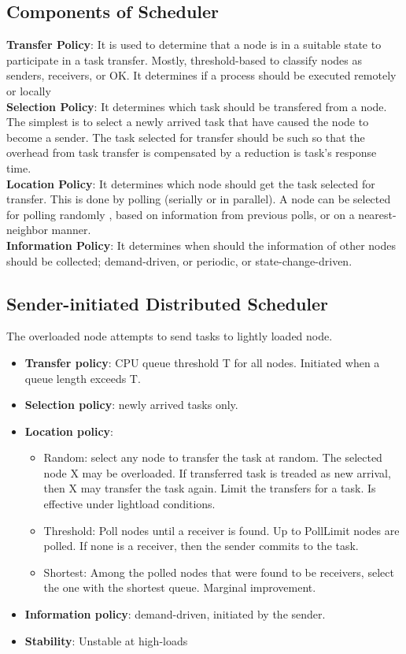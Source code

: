 \documentclass[twoside]{article}
\begin{document}
\subsection{Components of Scheduler}
{\bf Transfer Policy}: It is used to determine that a node is in a suitable state to participate in a task
transfer. Mostly, threshold-based to classify nodes as senders, receivers, or OK. It determines if a process should be executed remotely or locally\\
{\bf Selection Policy}: It determines which task should be transfered from a node. The simplest is to select a newly arrived task that have caused the node
to become a sender. The task selected for transfer should be such so that the overhead from
task transfer is compensated by a reduction is task's response time.\\
{\bf Location Policy}: It determines which node should get the task selected for transfer. This is done by polling
(serially or in parallel). A node can be selected for polling randomly , based on
information from previous polls, or on a nearest-neighbor manner.\\
{\bf Information Policy}: It determines when should the information of other nodes should be collected; demand-driven, or periodic, or state-change-driven.\\

\subsection{Sender-initiated Distributed Scheduler }
The overloaded node attempts to send tasks to lightly loaded node.
\begin{itemize}
\item {\bf Transfer policy}: CPU queue threshold T for all nodes. Initiated when a queue length exceeds T.
\item {\bf Selection policy}: newly arrived tasks only. 
\item {\bf Location policy}:
\begin{itemize}
\item Random: select any node to transfer the task at random. The selected node X
may be overloaded. If transferred task is treaded as new arrival, then X may
transfer the task again. Limit the transfers for a task. Is effective under lightload
conditions.
\item Threshold: Poll nodes until a receiver is found. Up to PollLimit nodes are polled.
If none is a receiver, then the sender commits to the task.
\item Shortest: Among the polled nodes that were found to be receivers, select the
one with the shortest queue. Marginal improvement.
\end{itemize}
\item {\bf Information policy}: demand-driven, initiated by the sender.
\item {\bf Stability}: Unstable at high-loads
\end{itemize}
\end{document}
